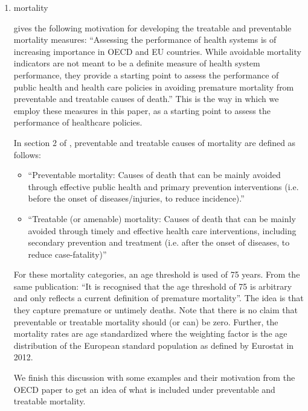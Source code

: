 \documentclass[a4paper,12pt]{article}
\begin{document}
\begin{enumerate}
\item mortality
\label{sec:orge5061f9}
\label{sec:mortality}

\cite{OECD_avoidable_mortality} gives the following motivation for developing the treatable and preventable mortality measures: ``Assessing the performance of health systems is of increasing importance in OECD and EU countries. While avoidable mortality indicators are not meant to be a definite measure of health system performance, they provide a starting point to assess the performance of public health and health care policies in avoiding premature mortality from preventable and treatable causes of death.'' This is the way in which we employ these measures in this paper, as a starting point to assess the performance of healthcare policies. 

In section 2 of \cite{OECD_avoidable_mortality}, preventable and treatable causes of mortality are defined as follows:
\begin{itemize}
\item ``Preventable mortality: Causes of death that can be mainly avoided through effective public health and primary prevention interventions (i.e. before the onset of diseases/injuries, to reduce incidence).''
\item ``Treatable (or amenable) mortality: Causes of death that can be mainly avoided through timely and effective health care interventions, including secondary prevention and treatment (i.e. after the onset of diseases, to reduce case-fatality)''
\end{itemize}

For these mortality categories, an age threshold is used of 75 years. From the same publication: ``It is recognised that the age threshold of 75 is arbitrary and only reflects a current definition of premature mortality''. The idea is that they capture premature or untimely deaths. Note that there is no claim that preventable or treatable mortality should (or can) be zero. Further, the mortality rates are age standardized where the weighting factor is the age distribution of the European standard population as defined by Eurostat in 2012.

We finish this discussion with some examples and their motivation from the OECD paper to get an idea of what is included under preventable and treatable mortality.


\end{enumerate}
\end{document}
